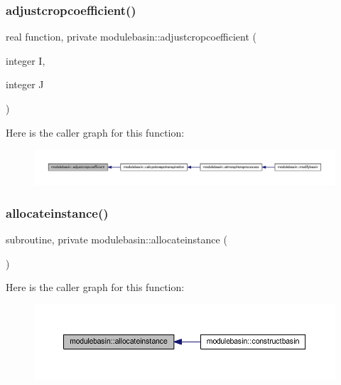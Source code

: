 \subsubsection{\texorpdfstring{adjustcropcoefficient()}{adjustcropcoefficient()}}
{\footnotesize\ttfamily real function, private modulebasin\+::adjustcropcoefficient (\begin{DoxyParamCaption}\item[{integer}]{I,  }\item[{integer}]{J }\end{DoxyParamCaption})\hspace{0.3cm}{\ttfamily [private]}}

Here is the caller graph for this function\+:\nopagebreak
\begin{figure}[H]
\begin{center}
\leavevmode
\includegraphics[width=350pt]{namespacemodulebasin_af1790be65f99274cd923932448358912_icgraph}
\end{center}
\end{figure}
\mbox{\label{namespacemodulebasin_a59f6b3609f5cf292bc0d40591c8d6d33}} 
\subsubsection{\texorpdfstring{allocateinstance()}{allocateinstance()}}
{\footnotesize\ttfamily subroutine, private modulebasin\+::allocateinstance (\begin{DoxyParamCaption}{ }\end{DoxyParamCaption})\hspace{0.3cm}{\ttfamily [private]}}

Here is the caller graph for this function\+:\nopagebreak
\begin{figure}[H]
\begin{center}
\leavevmode
\includegraphics[width=350pt]{namespacemodulebasin_a59f6b3609f5cf292bc0d40591c8d6d33_icgraph}
\end{center}
\end{figure}
\mbox{\label{namespacemodulebasin_a86eb7d3c4f70fdc55c9b4a4945a8ad9b}} 
